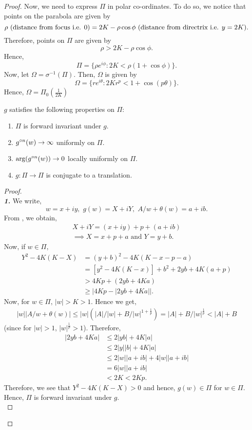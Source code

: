 \begin{proof}
	Now, we need to express \( \Pi  \) in polar co-ordinates. To do so, we notice that points on the parabola are given by \[
		\rho \text{ (distance from focus i.e. \( 0 \))}= 2K-\rho \cos \phi \text{ (distance from directrix i.e. \( y=2K \))}
	.\] 
	Therefore, points on \( \Pi \) are given by \[
		\rho > 2K-\rho \cos \phi 
	.\] 
	Hence, \[
		\Pi=\{\rho e^{i\phi }:2K<\rho (1+\cos \phi )\}
	.\] Now, let \( \Omega=\sigma^{-1}(\Pi) \).
	Then, \( \Omega \) is given by \[
		\Omega=\{re^{i \theta }:2Kr^p<1+\cos (p\theta )\}
.\] Hence, \( \Omega=\Pi_0\left(\frac{1}{2K}\right) \)

\begin{lemma}
	\( g \) satisfies the following properties on \( \Pi \):
	\begin{enumerate}
		\item \(\Pi\) is forward invariant under \( g \).
		\item \( \gog[n](w)\to \infty \) uniformly on \( \Pi \).
		\item \( \arg(\gog[n](w))\to 0 \) locally uniformly on \( \Pi \).
		\item \( g:\Pi\to \Pi \) is conjugate to a translation.
	\end{enumerate}
\end{lemma}
\begin{proof}\text{}\\
	\noindent \textbf{\emph{1.}} We write, \[
		w=x+iy,\,\, g(w)=X+iY,\,\, A /w+\theta(w)=a+ib
	.\] 
	From , we obtain,
	\begin{align*}
		X+iY=(x+iy)+p+(a+ib)\\
	\implies X=x+p+a\text{ and }Y=y+b
	.\end{align*}
	Now, if \( w\in \Pi  \),
	\begin{align*}
		Y^2-4K(K-X)&=(y+b)^2-4K(K-x-p-a)\\
				   &=[y^2-4K(K-x)]+b^2+2yb+4K(a+p)\\
				   &> 4Kp+(2yb+4Ka)\\
				   &\ge |4Kp- |2yb+4Ka| |
	.\end{align*}
	Now, for \( w\in\Pi \), \( |w|>K>1 \). Hence we get,
	\begin{align}
		|w||A /w+\theta (w)|\le |w| (|A| /|w|+ B /|w|^{1+\frac{1}{p}})=|A|+B /|w|^{\frac{1}{p}}<|A|+B \label{eqn3.3}
	\end{align}
	(since for \( |w|>1 \), \( |w|^{\frac{1}{p}}>1 \)).  Therefore,
	\begin{align*}
		|2yb+4Ka|&\le 2|yb|	+4K|a|\\
				 &\le 2|y| |b|+4 K |a| \\
				 &\le 2|w| |a+ib| +4 |w| |a+ib| \\
				 &=6|w| |a+ib|\\
				 &<2K<2Kp
	.\end{align*}
	Therefore, we see that \( Y^2-4K(K-X)>0 \) and hence, \( g(w)\in \Pi \) for \( w\in \Pi \).
	Hence, \( \Pi \) is forward invariant under \( g \).\\
	\vspace{1pt}


\end{proof}
\end{proof}
